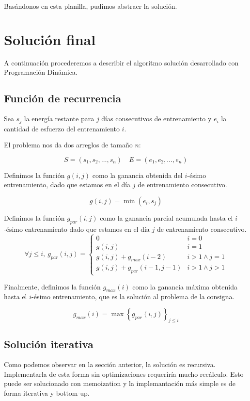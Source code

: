Basándonos en esta planilla, pudimos abstraer la solución.

\section{Solución final}

A continuación procederemos a describir el algoritmo solución desarrollado con Programación Dinámica.

\subsection{Función de recurrencia}

Sea $s_{j}$ la energía restante para $j$ días consecutivos de entrenamiento y
$e_{i}$ la cantidad de esfuerzo del entrenamiento $i$.

El problema nos da dos arreglos de tamaño $n$:

$$
S = (s_{1},s_{2},\dots ,s_{n}) \quad E=(e_{1},e_{2},\dots ,e_{n})
$$

Definimos la función $g(i,j)$ como la ganancia obtenida del $i$-ésimo entrenamiento,
dado que estamos en el día $j$ de entrenamiento consecutivo.

$$
g(i,j)=\min{(e_{i},s_{j})}
$$

Definimos la función $g_{par}(i,j)$ como la ganancia parcial acumulada hasta el $i$-ésimo entrenamiento
dado que estamos en el día $j$ de entrenamiento consecutivo.
$$
\forall j\leq i,\  g_{par}(i,j)=\begin{cases}
0 & i=0 \\
g(i,j) & i=1 \\
g(i,j)+g_{max}(i-2) & i>1 \land j=1 \\
g(i,j)+g_{par}(i-1,j-1) & i>1 \land j>1
\end{cases}
$$

Finalmente, definimos la función $g_{max}(i)$ como la ganancia máxima obtenida hasta el $i$-ésimo
entrenamiento, que es la solución al problema de la consigna.

$$
g_{max}(i)=\max{\left\{ g_{par}(i,j) \right\}_{j\leq i}}
$$

\subsection{Solución iterativa}

Como podemos observar en la sección anterior, la solución es recursiva. Implementarla de esta forma sin
optimizaciones requeriría mucho recálculo. Esto puede ser solucionado con memoization y la implemantación más
simple es de forma iterativa y bottom-up.

